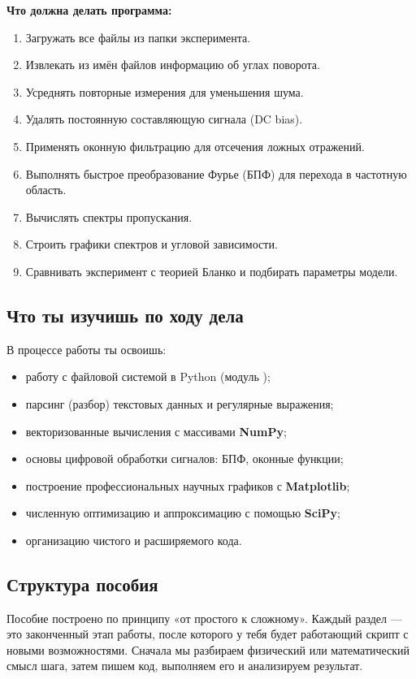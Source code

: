 \textbf{Что должна делать программа:}
\begin{enumerate}
	\item Загружать все файлы из папки эксперимента.
	\item Извлекать из имён файлов информацию об углах поворота.
	\item Усреднять повторные измерения для уменьшения шума.
	\item Удалять постоянную составляющую сигнала (DC bias).
	\item Применять оконную фильтрацию для отсечения ложных отражений.
	\item Выполнять быстрое преобразование Фурье (БПФ) для перехода в частотную область.
	\item Вычислять спектры пропускания.
	\item Строить графики спектров и угловой зависимости.
	\item Сравнивать эксперимент с теорией Бланко и подбирать параметры модели.
\end{enumerate}

\subsection*{Что ты изучишь по ходу дела}

В процессе работы ты освоишь:
\begin{itemize}
	\item работу с файловой системой в Python (модуль );
	\item парсинг (разбор) текстовых данных и регулярные выражения;
	\item векторизованные вычисления с массивами \textbf{NumPy};
	\item основы цифровой обработки сигналов: БПФ, оконные функции;
	\item построение профессиональных научных графиков с \textbf{Matplotlib};
	\item численную оптимизацию и аппроксимацию с помощью \textbf{SciPy};
	\item организацию чистого и расширяемого кода.
\end{itemize}

\subsection*{Структура пособия}

Пособие построено по принципу «от простого к сложному». Каждый раздел —
это законченный этап работы, после которого у тебя будет работающий скрипт
с новыми возможностями. Сначала мы разбираем физический или математический смысл шага, затем пишем код, выполняем его и анализируем результат.

